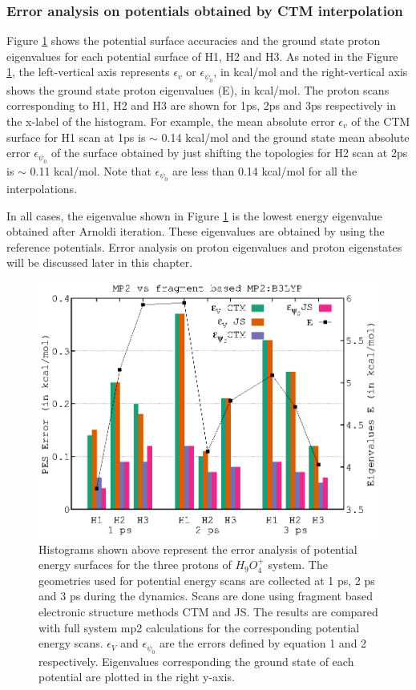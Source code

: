 \subsubsection{Error analysis on potentials obtained by CTM interpolation}
Figure \ref{chap3fig4} shows the potential surface accuracies and the ground state proton
eigenvalues for each potential surface of H1, H2 and H3. As noted in the Figure \ref{chap3fig4},
the left-vertical axis represents $\epsilon_{v}$  or $\epsilon_{\psi_{0}}$, in kcal/mol and the
right-vertical axis shows the ground state proton eigenvalues (E), in kcal/mol. The proton scans
corresponding to H1, H2 and H3 are shown for 1ps, 2ps and 3ps respectively in the x-label of the
histogram. For example, the mean absolute error $\epsilon_{v}$ of the CTM surface for H1 scan at
1ps is $\sim$ 0.14 kcal/mol and the ground state mean absolute error $\epsilon_{\psi_{0}}$ of
the surface obtained by just shifting the topologies for H2 scan at 2ps is $\sim$ 0.11 kcal/mol.
Note that $\epsilon_{\psi_{0}}$ are less than 0.14 kcal/mol for all the interpolations.

In all cases, the eigenvalue shown in Figure \ref{chap3fig4} is the lowest energy eigenvalue obtained
after Arnoldi iteration. These eigenvalues are obtained by using the reference potentials. Error
analysis on proton eigenvalues and proton eigenstates will be discussed later in this chapter.

\begin{figure}[H]
  \begin{center}
    \includegraphics[width=1\textwidth]{figures/bars.eps}
    \caption{\label{chap3fig4} Histograms shown above represent the error analysis of potential energy surfaces
    for the three protons of $H_9O_4^+$ system. The geometries used for potential energy scans are collected at
    1 ps, 2 ps and 3 ps during the dynamics. Scans are done using fragment based electronic structure methods
    CTM and JS. The results are compared with full system mp2 calculations for the corresponding potential
    energy scans. $\epsilon_{V}$ and $\epsilon_{\psi_{0}}$ are the errors defined by equation 1 and 2
    respectively. Eigenvalues corresponding the ground state of each potential are plotted in the right y-axis.}
  \end{center}
\end{figure}

